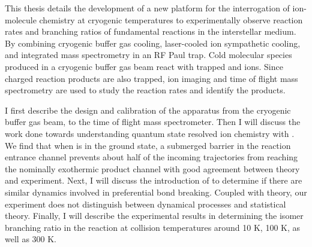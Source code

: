 This thesis details the development of a new platform for the interrogation of ion-molecule chemistry at cryogenic temperatures to experimentally observe reaction rates and branching ratios of fundamental reactions in the interstellar medium. By combining cryogenic buffer gas cooling, laser-cooled ion sympathetic cooling, and integrated mass spectrometry in an RF Paul trap. Cold molecular species produced in a cryogenic buffer gas beam react with trapped  and  ions. Since charged reaction products are also trapped, ion imaging and time of flight mass spectrometry are used to study the reaction rates and identify the products.

I first describe the design and calibration of the apparatus from the cryogenic buffer gas beam, to the time of flight mass spectrometer. Then I will discuss the work done towards understanding quantum state resolved  ion chemistry with . We find that when  is in the ground state, a submerged barrier in the reaction entrance channel prevents about half of the incoming trajectories from reaching the nominally exothermic product channel with good agreement between theory and experiment. Next, I will discuss the introduction of  to determine if there are similar dynamics involved in preferential bond breaking. Coupled with theory, our experiment does not distinguish between dynamical processes and statistical theory. Finally, I will describe the experimental results in determining the isomer branching ratio in the  reaction at collision temperatures around 10 K, 100 K, as well as 300 K.